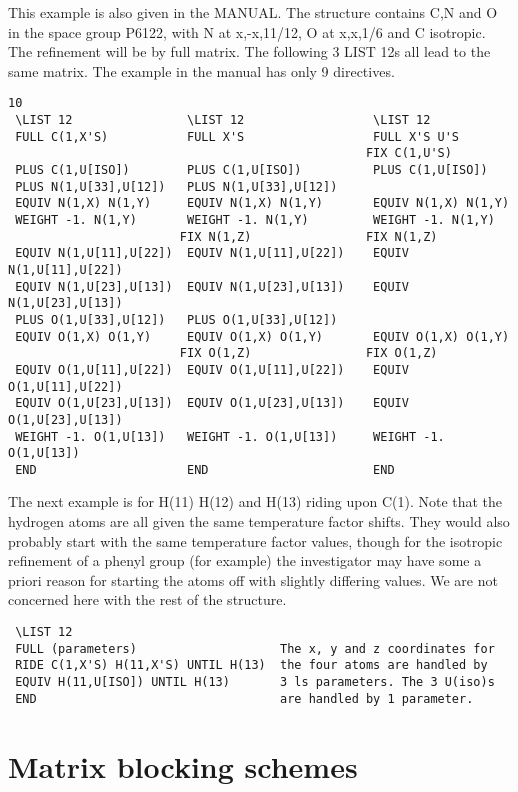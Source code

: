 \documentclass[10pt,a4paper]{report}
\begin{document}
This example is also given in the MANUAL. The structure contains C,N and O
 in the space group P6122, with N at x,-x,11/12, O at x,x,1/6 and C isotropic.
 The refinement will be by full matrix. The following 3 LIST 12s all lead to
 the same matrix. The example in the manual has only 9 directives.
\small\begin{verbatim}10
 \LIST 12                \LIST 12                  \LIST 12
 FULL C(1,X'S)           FULL X'S                  FULL X'S U'S
                                                  FIX C(1,U'S)
 PLUS C(1,U[ISO])        PLUS C(1,U[ISO])          PLUS C(1,U[ISO])
 PLUS N(1,U[33],U[12])   PLUS N(1,U[33],U[12])
 EQUIV N(1,X) N(1,Y)     EQUIV N(1,X) N(1,Y)       EQUIV N(1,X) N(1,Y)
 WEIGHT -1. N(1,Y)       WEIGHT -1. N(1,Y)         WEIGHT -1. N(1,Y)
                        FIX N(1,Z)                FIX N(1,Z)
 EQUIV N(1,U[11],U[22])  EQUIV N(1,U[11],U[22])    EQUIV N(1,U[11],U[22])
 EQUIV N(1,U[23],U[13])  EQUIV N(1,U[23],U[13])    EQUIV N(1,U[23],U[13])
 PLUS O(1,U[33],U[12])   PLUS O(1,U[33],U[12])
 EQUIV O(1,X) O(1,Y)     EQUIV O(1,X) O(1,Y)       EQUIV O(1,X) O(1,Y)
                        FIX O(1,Z)                FIX O(1,Z)
 EQUIV O(1,U[11],U[22])  EQUIV O(1,U[11],U[22])    EQUIV O(1,U[11],U[22])
 EQUIV O(1,U[23],U[13])  EQUIV O(1,U[23],U[13])    EQUIV O(1,U[23],U[13])
 WEIGHT -1. O(1,U[13])   WEIGHT -1. O(1,U[13])     WEIGHT -1. O(1,U[13])
 END                     END                       END 
\end{verbatim}\normalsize




The next example is for H(11) H(12) and H(13) riding upon C(1). Note
 that the hydrogen atoms are all given the same temperature factor shifts.
 They would also probably start with the same temperature factor values,
 though for the isotropic refinement of a phenyl group (for example)
 the investigator may have some a priori reason for starting the atoms off
 with slightly differing values. We are not concerned here with the rest of
 the structure.

\small\begin{verbatim}
 \LIST 12
 FULL (parameters)                    The x, y and z coordinates for 
 RIDE C(1,X'S) H(11,X'S) UNTIL H(13)  the four atoms are handled by
 EQUIV H(11,U[ISO]) UNTIL H(13)       3 ls parameters. The 3 U(iso)s
 END                                  are handled by 1 parameter.
\end{verbatim}\normalsize


\section{Matrix blocking schemes}
\end{document}
